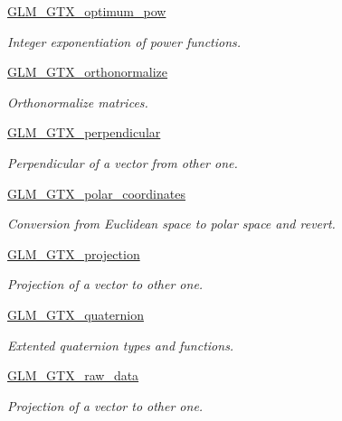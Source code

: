 \begin{CompactItemize}
\item 
\hyperlink{group__gtx__optimum__pow}{GLM\_\-GTX\_\-optimum\_\-pow}
\begin{CompactList}\small\item\em Integer exponentiation of power functions. \item\end{CompactList}

\item 
\hyperlink{group__gtx__orthonormalize}{GLM\_\-GTX\_\-orthonormalize}
\begin{CompactList}\small\item\em Orthonormalize matrices. \item\end{CompactList}

\item 
\hyperlink{group__gtx__perpendicular}{GLM\_\-GTX\_\-perpendicular}
\begin{CompactList}\small\item\em Perpendicular of a vector from other one. \item\end{CompactList}

\item 
\hyperlink{group__gtx__polar__coordinates}{GLM\_\-GTX\_\-polar\_\-coordinates}
\begin{CompactList}\small\item\em Conversion from Euclidean space to polar space and revert. \item\end{CompactList}

\item 
\hyperlink{group__gtx__projection}{GLM\_\-GTX\_\-projection}
\begin{CompactList}\small\item\em Projection of a vector to other one. \item\end{CompactList}

\item 
\hyperlink{group__gtx__quaternion}{GLM\_\-GTX\_\-quaternion}
\begin{CompactList}\small\item\em Extented quaternion types and functions. \item\end{CompactList}

\item 
\hyperlink{group__gtx__raw__data}{GLM\_\-GTX\_\-raw\_\-data}
\begin{CompactList}\small\item\em Projection of a vector to other one. \item\end{CompactList}


\end{CompactItemize}
